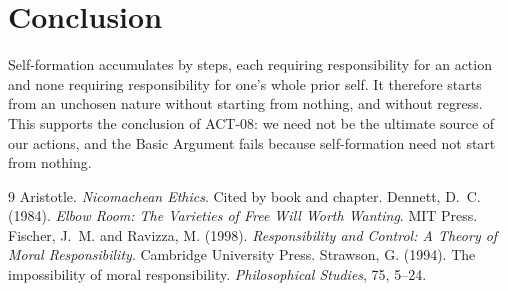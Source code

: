 \documentclass{situationist-preprint}
\begin{document}
\section{Conclusion}

Self-formation accumulates by steps, each requiring responsibility for an action and none requiring responsibility for one's whole prior self. It therefore starts from an unchosen nature without starting from nothing, and without regress. This supports the conclusion of ACT-08: we need not be the ultimate source of our actions, and the Basic Argument fails because self-formation need not start from nothing.

\begin{thebibliography}{9}
 Aristotle. \emph{Nicomachean Ethics}. Cited by book and chapter.
 Dennett, D.~C. (1984). \emph{Elbow Room: The Varieties of Free Will Worth Wanting}. MIT Press.
 Fischer, J.~M. and Ravizza, M. (1998). \emph{Responsibility and Control: A Theory of Moral Responsibility}. Cambridge University Press.
 Strawson, G. (1994). The impossibility of moral responsibility. \emph{Philosophical Studies}, 75, 5--24.
\end{thebibliography}
\end{document}
